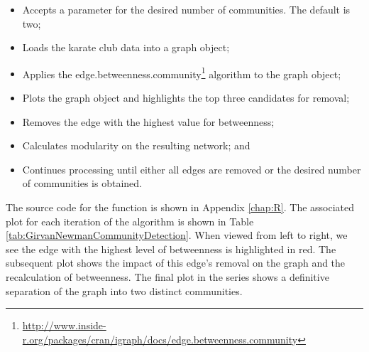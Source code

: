 \documentclass[letterpaper,11pt]{report}
\begin{document}
\begin{savenotes}
\begin{itemize}
\item Accepts a parameter for the desired number of communities. The default is two;
\item Loads the karate club data into a graph object;
\item Applies the edge.betweenness.community\footnote{\url{http://www.inside-r.org/packages/cran/igraph/docs/edge.betweenness.community}} algorithm to the graph object;
\item Plots the graph object and highlights the top three candidates for removal;
\item Removes the edge with the highest value for betweenness;
\item Calculates modularity on the resulting network; and
\item Continues processing until either all edges are removed or the desired number of communities is obtained.
\end{itemize}

\indent{}The source code for the function is shown in Appendix \ref{chap:R}. The associated plot for each iteration of the algorithm is shown in Table \ref{tab:GirvanNewmanCommunityDetection}. When viewed from left to right, we see the edge with the highest level of betweenness is highlighted in red. The subsequent plot shows the impact of this edge's removal on the graph and the recalculation of betweenness. The final plot in the series shows a definitive separation of the graph into two distinct communities. 


\end{savenotes}
\end{document}
